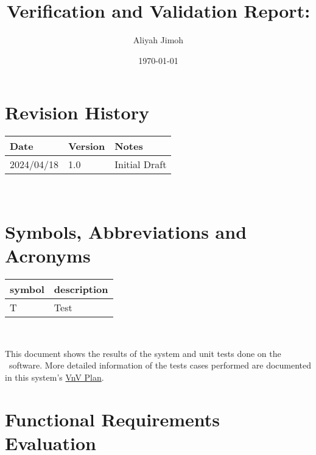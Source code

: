 \documentclass[12pt, titlepage]{article}
\begin{document}
\title{Verification and Validation Report: \progname} 
\author{Aliyah Jimoh}
\date{\today}
	
\maketitle


\section{Revision History}

\begin{tabularx}{\textwidth}{p{3cm}p{2cm}X}
\toprule {\bf Date} & {\bf Version} & {\bf Notes}\\
\midrule
2024/04/18 & 1.0 & Initial Draft\\
\bottomrule
\end{tabularx}

~\newpage

\section{Symbols, Abbreviations and Acronyms}

\renewcommand{\arraystretch}{1.2}
\begin{tabular}{l l} 
  \toprule		
  \textbf{symbol} & \textbf{description}\\
  \midrule 
  T & Test\\
  \bottomrule
\end{tabular}\\


\newpage

\tableofcontents

\listoftables %

\listoffigures %

\newpage


This document shows the results of the system and unit tests done on the \progname~software. More detailed information of the tests cases performed are documented in this system's \hyperlink{https://github.com/AliyahJimoh/2D-Localizer/blob/main/docs/VnVPlan/VnVPlan.pdf}{VnV Plan}.

\section{Functional Requirements Evaluation}
\end{document}
